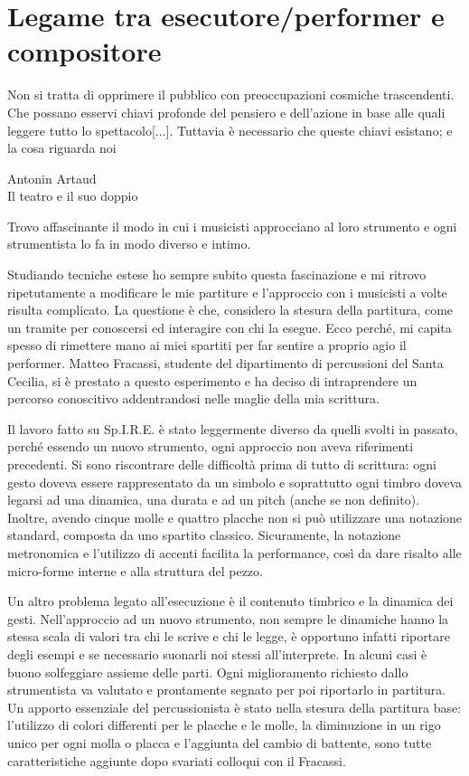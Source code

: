 
\section{Legame tra esecutore/performer e compositore}

\epigraph{Non si tratta di opprimere il pubblico con preoccupazioni cosmiche trascendenti. Che possano esservi chiavi profonde del pensiero e dell'azione in base alle quali leggere tutto lo spettacolo[...].
Tuttavia è necessario che queste chiavi esistano; e la cosa riguarda noi}{Antonin Artaud \\ Il teatro e il suo doppio}

Trovo affascinante il modo in cui i musicisti approcciano al loro strumento e ogni strumentista lo fa in modo diverso e intimo. 

Studiando tecniche estese ho sempre subito questa fascinazione e mi ritrovo ripetutamente a modificare le mie partiture e l'approccio con i musicisti a volte risulta complicato. La questione è che, considero la stesura della partitura, come un tramite per conoscersi ed interagire con chi la esegue. Ecco perché, mi capita spesso di rimettere mano ai miei spartiti per far sentire a proprio agio il performer. Matteo Fracassi, studente del dipartimento di percussioni del Santa Cecilia, si è prestato a questo esperimento e ha deciso di intraprendere un percorso conoscitivo addentrandosi nelle maglie della mia scrittura.

Il lavoro fatto su Sp.I.R.E. è stato leggermente diverso da quelli svolti in passato, perché essendo un nuovo strumento, ogni approccio non aveva riferimenti precedenti. Si sono riscontrare delle difficoltà prima di tutto di scrittura: ogni gesto doveva essere rappresentato da un simbolo e soprattutto ogni timbro doveva legarsi ad una dinamica, una durata e ad un pitch (anche se non definito). Inoltre, avendo cinque molle e quattro placche non si può utilizzare una notazione standard, composta da uno spartito classico. Sicuramente, la notazione metronomica e l'utilizzo di accenti facilita la performance, così da dare risalto alle micro-forme interne e alla struttura del pezzo.

Un altro problema legato all'esecuzione è il contenuto timbrico e la dinamica dei gesti. Nell'approccio ad un nuovo strumento, non sempre le dinamiche hanno la stessa scala di valori tra chi le scrive e chi le legge, è opportuno infatti riportare degli esempi e se necessario suonarli noi stessi all'interprete. In alcuni casi è buono solfeggiare assieme delle parti. Ogni miglioramento richiesto dallo strumentista va valutato e prontamente segnato per poi riportarlo in partitura. Un apporto essenziale del percussionista è stato nella stesura della partitura base: l'utilizzo di colori differenti per le placche e le molle, la diminuzione in un rigo unico per ogni molla o placca e l'aggiunta del cambio di battente, sono tutte caratteristiche aggiunte dopo svariati colloqui con il Fracassi. 

